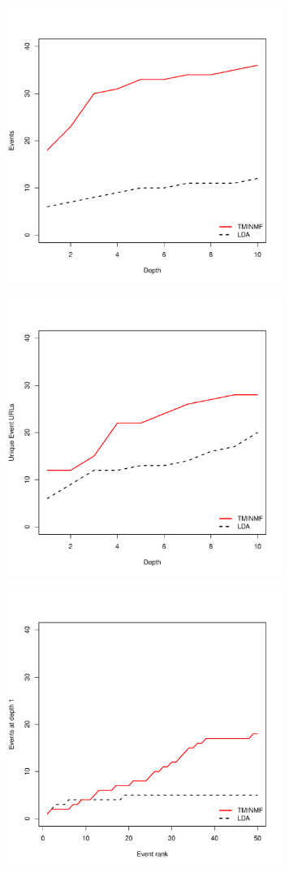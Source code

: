 \documentclass{sig-alternate}
\begin{document}
\begin{figure}[!ht]
\centering
\begin{subfigure}{.5\textwidth}
  \centering
\includegraphics[width=9cm]{plots/events_at_depth.pdf}
\end{subfigure}%
\begin{subfigure}{.5\textwidth}
  \centering
\includegraphics[width=9cm]{plots/unique_urls_at_depth.pdf}
\end{subfigure}
\begin{subfigure}{.5\textwidth}
  \centering
\includegraphics[width=9cm]{plots/events_at_rank_1.pdf}

\end{subfigure}
\end{figure}
\end{document}

